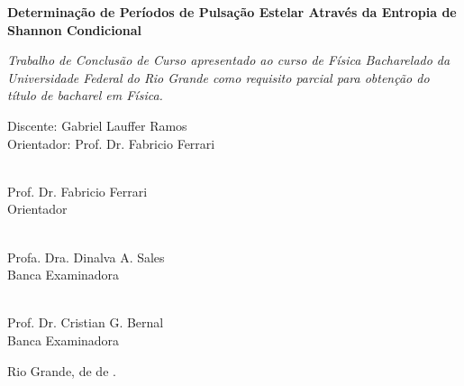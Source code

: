 \documentclass[
12pt, %
oneside, %
english, brazil, %
doublespacing,
nolistspacing, %
liststotoc, %
]{MastersDoctoralThesis} %
\begin{document}
\begin{titlepage}
	\begin{center}
		\textbf{Determinação de Períodos de Pulsação Estelar Através da Entropia de Shannon Condicional}

		\normalsize
		
		\vfill

		\large
		
		\textit{Trabalho de Conclusão de Curso apresentado ao curso de Física Bacharelado da Universidade Federal do Rio Grande como requisito parcial para obtenção do título de bacharel em Física.}\\ [0.3cm] 

		\normalsize
			\begin{flushright}
				Discente: Gabriel Lauffer Ramos \\
				Orientador: Prof. Dr. Fabricio Ferrari
			\end{flushright}
			
	\end{center}
	
	\vfill

	\begin{center}
		\underline{\hspace{7cm}} \\
		Prof. Dr. Fabricio Ferrari \\
		Orientador
	\end{center}

	\vfill

	\begin{minipage}{0.5\textwidth}
		\centering
		\underline{\hspace{6cm}}  \\
		Profa. Dra. Dinalva A. Sales \\
		Banca Examinadora
	\end{minipage}
%
	\begin{minipage}{0.5\textwidth}
		\centering
		\underline{\hspace{6cm}}   \\
		Prof. Dr. Cristian G. Bernal \\
		Banca Examinadora
	\end{minipage}

	\vfill

	\begin{flushright}
		Rio Grande, \underline{\hspace{1cm}} de  \underline{\hspace{4cm}} de  \underline{\hspace{2cm}}.
	\end{flushright}

\end{titlepage}
\end{document}
